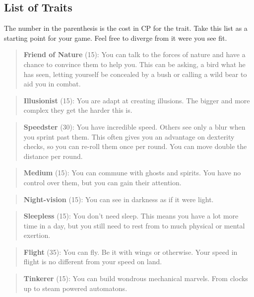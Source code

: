 \documentclass[11pt]{article}
\begin{document}
{\subsection{List of Traits}
\label{sec:org0e4c990}
The number in the parenthesis is the cost in CP for the trait. Take this list as a starting point for your game. Feel free to diverge from it were you see fit.

\begin{quote}
\textbf{Friend of Nature} (15): You can talk to the forces of nature and have a chance to convince them to help you. This can be asking, a bird what he has seen, letting yourself be concealed by a bush or calling a wild bear to aid you in combat.
\end{quote}

\begin{quote}
\textbf{Illusionist} (15): You are adapt at creating illusions. The bigger and more complex they get the harder this is.
\end{quote}

\begin{quote}
\textbf{Speedster} (30): You have incredible speed. Others see only a blur when you sprint past them. This often gives you an advantage on dexterity checks, so you can re-roll them once per round. You can move double the distance per round.
\end{quote}

\begin{quote}
\textbf{Medium} (15): You can commune with ghosts and spirits. You have no control over them, but you can gain their attention.
\end{quote}

\begin{quote}
\textbf{Night-vision} (15): You can see in darkness as if it were light.
\end{quote}

\begin{quote}
\textbf{Sleepless} (15): You don't need sleep. This means you have a lot more time in a day, but you still need to rest from to much physical or mental exertion.
\end{quote}

\begin{quote}
\textbf{Flight} (35): You can fly. Be it with wings or otherwise. Your speed in flight is no different from your speed on land.
\end{quote}

\begin{quote}
\textbf{Tinkerer} (15): You can build wondrous mechanical marvels. From clocks up to steam powered automatons. 
\end{quote}

}
\end{document}

